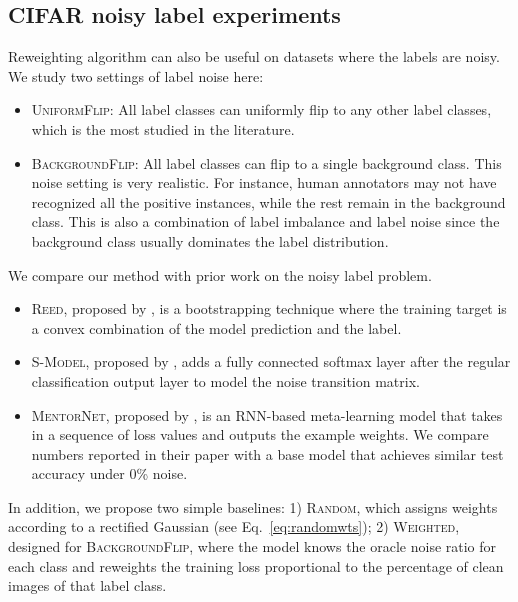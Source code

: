 \subsection{CIFAR noisy label experiments}

Reweighting algorithm can also be useful on datasets where the labels are noisy. We study two
settings of label noise here: 
\begin{itemize}
    \vspace{-0.1in}

    \item \textsc{UniformFlip}: All label classes can uniformly flip to any other label classes,
which is the most studied in the literature.

    \vspace{-0.1in}

    \item \textsc{BackgroundFlip}: All label classes can flip to a single background class. This
noise setting is very realistic. For instance, human annotators may not have recognized all the
positive instances, while the rest remain in the background class. This is also a combination of
label imbalance and label noise since the background class usually dominates the label distribution.

\end{itemize}
We compare our method with prior work on the noisy label problem.
\vspace{-0.1in}
\begin{itemize}
\item \textsc{Reed}, proposed by \citet{reed14noisy}, is a bootstrapping technique where the
training target is a convex combination of the model prediction and the label.

\item \textsc{S-Model}, proposed by \citet{goldberger17noise}, adds a fully connected softmax layer
after the regular classification output layer to model the noise transition matrix.

\item \textsc{MentorNet}, proposed by \citet{jiang17mentornet}, is an RNN-based meta-learning model
that takes in a sequence of loss values and outputs the example weights. We compare numbers reported
in their paper with a base model that achieves similar test accuracy under 0\% noise.
\end{itemize}
In addition, we propose two simple baselines: 
1) \textsc{Random}, which assigns weights according to a rectified Gaussian (see
   Eq.~\ref{eq:randomwts});
2) \textsc{Weighted}, designed for \textsc{BackgroundFlip}, where the model
knows the oracle noise ratio for each class and reweights the training loss proportional to the
percentage of clean images of that label class.
\vspace{-0.05in}
